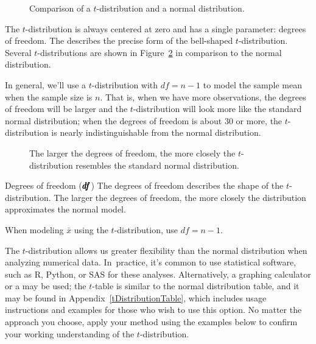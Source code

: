 \begin{figure}[h]
  \centering
  \caption{Comparison of a $t$-distribution
      and a normal distribution.}
  \label{tDistCompareToNormalDist}
\end{figure}

The $t$-distribution is always centered at zero and
has a single parameter: degrees of freedom.
The 
describes the precise form of the bell-shaped $t$-distribution.
Several $t$-distributions are shown in
Figure~\ref{tDistConvergeToNormalDist}
in comparison to the normal distribution.

In general, we'll use a $t$-distribution
with $df = n - 1$ to model the sample mean
when the sample size is $n$.
That is, when we have more observations,
the degrees of freedom will be larger and
the $t$-distribution will look more like the
standard normal distribution;
when the degrees of freedom is about 30 or more,
the $t$-distribution is nearly indistinguishable
from the normal distribution.

\begin{figure}[h]
  \centering
  \caption{The larger the degrees of freedom, the more
      closely the $t$-distribution resembles the standard
      normal distribution.}
  \label{tDistConvergeToNormalDist}
\end{figure}

\begin{onebox}{Degrees of freedom
    ($\pmb{\MakeLowercase{df}}$)}
  The degrees of freedom describes the shape of the
  $t$-distribution.
  The larger the degrees of freedom, the more closely
  the distribution approximates the normal model. \stdvspace{}

  When modeling $\bar{x}$ using the $t$-distribution,
  use $df = n - 1$.
\end{onebox}


The $t$-distribution allows us greater flexibility than
the normal distribution when analyzing numerical data.
In~practice, it's common to use statistical software,
such as R, Python, or SAS for these analyses.
Alternatively, a graphing calculator or a
 may be used;
the $t$-table is similar to the normal distribution table,
and it may be found in Appendix~\ref{tDistributionTable},
which includes usage instructions and examples
for those who wish to use this option.
No matter the approach you choose, apply your method
using the examples below to confirm your working
understanding of the $t$-distribution.

